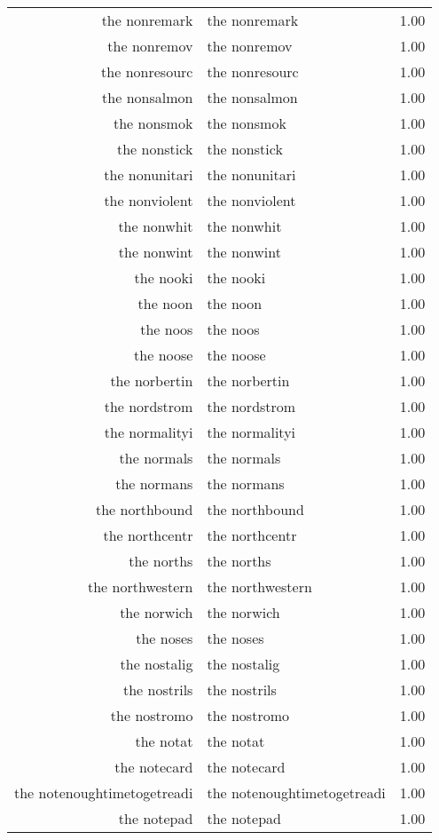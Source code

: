 \begin{table}[ht]
\begin{tabular}{rlr}
  the nonremark & the nonremark & 1.00 \\ 
  the nonremov & the nonremov & 1.00 \\ 
  the nonresourc & the nonresourc & 1.00 \\ 
  the nonsalmon & the nonsalmon & 1.00 \\ 
  the nonsmok & the nonsmok & 1.00 \\ 
  the nonstick & the nonstick & 1.00 \\ 
  the nonunitari & the nonunitari & 1.00 \\ 
  the nonviolent & the nonviolent & 1.00 \\ 
  the nonwhit & the nonwhit & 1.00 \\ 
  the nonwint & the nonwint & 1.00 \\ 
  the nooki & the nooki & 1.00 \\ 
  the noon & the noon & 1.00 \\ 
  the noos & the noos & 1.00 \\ 
  the noose & the noose & 1.00 \\ 
  the norbertin & the norbertin & 1.00 \\ 
  the nordstrom & the nordstrom & 1.00 \\ 
  the normalityi & the normalityi & 1.00 \\ 
  the normals & the normals & 1.00 \\ 
  the normans & the normans & 1.00 \\ 
  the northbound & the northbound & 1.00 \\ 
  the northcentr & the northcentr & 1.00 \\ 
  the norths & the norths & 1.00 \\ 
  the northwestern & the northwestern & 1.00 \\ 
  the norwich & the norwich & 1.00 \\ 
  the noses & the noses & 1.00 \\ 
  the nostalig & the nostalig & 1.00 \\ 
  the nostrils & the nostrils & 1.00 \\ 
  the nostromo & the nostromo & 1.00 \\ 
  the notat & the notat & 1.00 \\ 
  the notecard & the notecard & 1.00 \\ 
  the notenoughtimetogetreadi & the notenoughtimetogetreadi & 1.00 \\ 
  the notepad & the notepad & 1.00 \\ 

\end{tabular}
\end{table}
